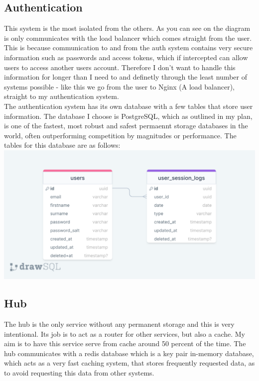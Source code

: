 \documentclass[titlepage]{article}
\begin{document}
\subsection{Authentication}
This system is the most isolated from the others. As you can see on the diagram is only communicates with the load balancer which comes straight from the user. This is because communication to and from the auth system contains very secure information such as passwords and access tokens, which if intercepted can allow users to access another users account. Therefore I don't want to handle this information for longer than I need to and definetly through the least number of systems possible - like this we go from the user to Nginx (A load balancer), straight to my authentication system. \\

The authentication system has its own database with a few tables that store user information. The database I choose is PostgreSQL, which as outlined in my plan, is one of the fastest, most robust and safest permaennt storage databases in the world, often outperforming competition by magnitudes or performance. The tables for this database are as follows: \\

\includegraphics[width=1\textwidth]{auth_diagram.png}

\subsection{Hub}
The hub is the only service without any permanent storage and this is very intentional. Its job is to act as a router for other services, but also a cache. My aim is to have this service serve from cache around 50 percent of the time. The hub communicates with a redis database which is a key pair in-memory database, which acts as a very fast caching system, that stores frequently requested data, as to avoid requesting this data from other systems. \\
\end{document}
